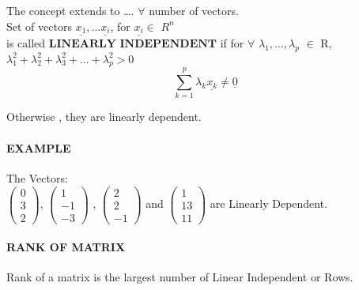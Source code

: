 \documentclass[]{article}
\let\oldparagraph\paragraph
\renewcommand{\paragraph}[1]{\oldparagraph{#1}\mbox{}}
\begin{document}
The concept extends to \ldots{}. \(\forall\) number of vectors.\\

Set of vectors \(\underline{x_1},...\underline{x_i}\), for
\(\underline{x_i} \in\) \(R^{n}\)\\

is called \(\textbf{LINEARLY INDEPENDENT}\) if for \(\forall\)
\(\lambda_1,...,\lambda_p\) \(\in\) R,
\(\lambda^2_1+\lambda^2_2+\lambda^2_3+...+\lambda^2_p > 0\)\\

\[\sum\limits_{k=1}^p \lambda_k \underline{x_k} \neq \underline{0}\]

Otherwise , they are linearly dependent.\\

\paragraph{\texorpdfstring{EXAMPLE\\
}{EXAMPLE }}\label{example}

The Vectors:\\
 \(\begin{pmatrix} 0\\ 3\\2 \end{pmatrix}\),
\(\begin{pmatrix} 1\\ -1\\-3 \end{pmatrix}\) ,
\(\begin{pmatrix} 2\\ 2\\-1 \end{pmatrix}\) and
\(\begin{pmatrix} 1\\ 13\\11 \end{pmatrix}\) are Linearly Dependent.

\paragraph{\texorpdfstring{RANK OF MATRIX\\
}{RANK OF MATRIX }}\label{rank-of-matrix}

\begin{tcolorbox}[colback=green!5,colframe=red!40!black,title=Definition]
Rank of a matrix is the largest number of Linear Independent or Rows. 



\end{tcolorbox}
\end{document}

